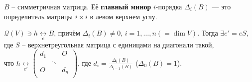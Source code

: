 \begin{to_def} 
	$B$ -- симметричная матрица. Её \textbf{главный минор} $i$-порядка $\Delta_i(B)$ --- это определитель матрицы $i \times i$ в левом верхнем углу. 
\end{to_def}

\begin{to_thr}
	 $\mathcal{Q}(V) \ni h \underset{e}{\longleftrightarrow} B$, причём $\Delta_i (B) \neq 0, \, i = 1,\ldots,n(=\dim V)$. Тогда $\exists e' = e S$, где $S$ -- верхнетреугольная матрица с единицами на диагонали такой, \\что $h \underset{e'}{\longleftrightarrow} 
	 \begin{pmatrix}
	 d_1&&O\\
	 &\ddots&\\
	 O&&d_n\\	
	 \end{pmatrix}$, где $d_i = \frac{\Delta_i(B)}{\Delta_{i-1}(B)}$ ($\Delta_0(B) = 1$).
\end{to_thr}

